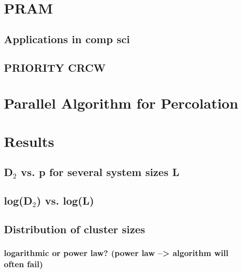 \documentclass{umthesis}
\begin{document}
\section{PRAM}
\label{sec-4.3}
\subsection{Applications in comp sci}
\label{sec-4.3.1}
\subsection{PRIORITY CRCW}
\label{sec-4.3.2}
\section{Parallel Algorithm for Percolation}
\label{sec-4.4}
\section{Results}
\label{sec-4.5}
\subsection{D$_2$ vs. p for several system sizes L}
\label{sec-4.5.1}
\subsection{log(D$_2$) vs. log(L)}
\label{sec-4.5.2}
\subsection{Distribution of cluster sizes}
\label{sec-4.5.3}
\subsubsection{logarithmic or power law? (power law --> algorithm will often fail)}
\label{sec-4.5.3.1}






 
    

    
\end{document}
